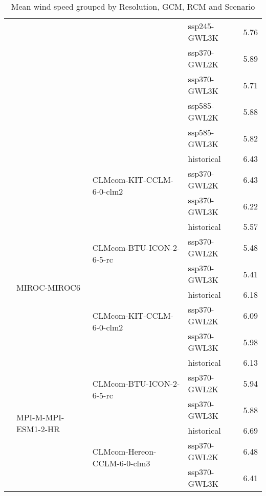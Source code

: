 \begin{table}[htbp]
{\begin{tabular}{lll|l|r}
 &  &  & ssp245-GWL3K & 5.76 \\
 &  &  & ssp370-GWL2K & 5.89 \\
 &  &  & ssp370-GWL3K & 5.71 \\
 &  &  & ssp585-GWL2K & 5.88 \\
 &  &  & ssp585-GWL3K & 5.82 \\
\cmidrule(lr){3-5}
 &  & \multirow{3}{*}{CLMcom-KIT-CCLM-6-0-clm2} & historical & 6.43 \\
 &  &  & ssp370-GWL2K & 6.43 \\
 &  &  & ssp370-GWL3K & 6.22 \\
\cmidrule(lr){3-5}
\cmidrule(lr){2-5}
 & \multirow{6}{*}{MIROC-MIROC6} & \multirow{3}{*}{CLMcom-BTU-ICON-2-6-5-rc} & historical & 5.57 \\
 &  &  & ssp370-GWL2K & 5.48 \\
 &  &  & ssp370-GWL3K & 5.41 \\
\cmidrule(lr){3-5}
 &  & \multirow{3}{*}{CLMcom-KIT-CCLM-6-0-clm2} & historical & 6.18 \\
 &  &  & ssp370-GWL2K & 6.09 \\
 &  &  & ssp370-GWL3K & 5.98 \\
\cmidrule(lr){3-5}
\cmidrule(lr){2-5}
 & \multirow{6}{*}{MPI-M-MPI-ESM1-2-HR} & \multirow{3}{*}{CLMcom-BTU-ICON-2-6-5-rc} & historical & 6.13 \\
 &  &  & ssp370-GWL2K & 5.94 \\
 &  &  & ssp370-GWL3K & 5.88 \\
\cmidrule(lr){3-5}
 &  & \multirow{3}{*}{CLMcom-Hereon-CCLM-6-0-clm3} & historical & 6.69 \\
 &  &  & ssp370-GWL2K & 6.48 \\
 &  &  & ssp370-GWL3K & 6.41 \\
\bottomrule
\end{tabular}
}
\label{Table:Wind_changes}
\caption{Mean wind speed grouped by Resolution, GCM, RCM and Scenario}
\end{table}
